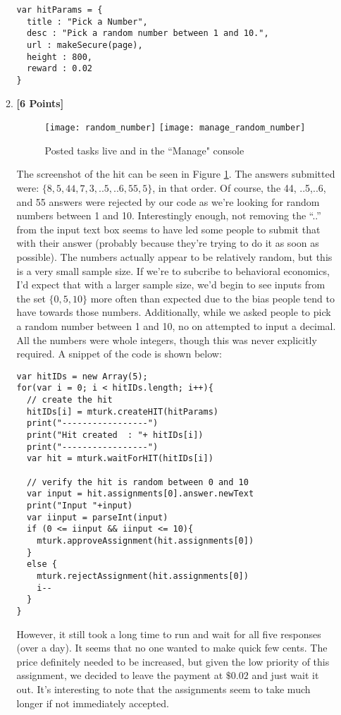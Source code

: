 \documentclass[11pt]{article}
\newcommand{\points}[1]{\textbf{[#1 Points]}}
\begin{document}
\begin{enumerate}
\begin{enumerate}
\begin{lstlisting}
var hitParams = {
  title : "Pick a Number",
  desc : "Pick a random number between 1 and 10.",
  url : makeSecure(page),
  height : 800,
  reward : 0.02
}
\end{lstlisting}

\item \points{6} 
\begin{figure}[!h]
\begin{center}
\texttt{[image: random\_number]}
\texttt{[image: manage\_random\_number]}
\end{center}
\caption{Posted tasks live and in the ``Manage" console}
\label{fig:random_number_hit}
\end{figure}

The screenshot of the hit can be seen in Figure \ref{fig:random_number_hit}. The answers submitted were: $\{8,5,44,7,3,..5,..6,55,5\}$, in that order. Of course, the 44, ..5,..6, and 55 answers were rejected by our code as we're looking for random numbers between 1 and 10. Interestingly enough, not removing the ``..'' from the input text box seems to have led some people to submit that with their answer (probably because they're trying to do it as soon as possible). The numbers actually appear to be relatively random, but this is a very small sample size. If we're to subcribe to behavioral economics, I'd expect that with a larger sample size, we'd begin to see inputs from the set $\{0,5,10 \}$  more often than expected due to the bias people tend to have towards those numbers. Additionally, while we asked people to pick a random number between 1 and 10, no on attempted to input a decimal. All the numbers were whole integers, though this was never explicitly required. A snippet of the code is shown below:

\begin{lstlisting}
var hitIDs = new Array(5);
for(var i = 0; i < hitIDs.length; i++){
  // create the hit
  hitIDs[i] = mturk.createHIT(hitParams)
  print("-----------------")
  print("Hit created  : "+ hitIDs[i])
  print("-----------------")
  var hit = mturk.waitForHIT(hitIDs[i])

  // verify the hit is random between 0 and 10
  var input = hit.assignments[0].answer.newText
  print("Input "+input)
  var iinput = parseInt(input)
  if (0 <= iinput && iinput <= 10){
    mturk.approveAssignment(hit.assignments[0])
  }
  else {
    mturk.rejectAssignment(hit.assignments[0])
    i--
  }
}
\end{lstlisting}

However, it still took  a long time to run and wait for all five responses (over a day). It seems that no one wanted to make quick few cents. The price definitely needed to be increased, but given the low priority of this assignment, we decided to leave the payment at $\$0.02$ and just wait it out. It's interesting to note that the assignments seem to take much longer if not immediately accepted.
\end{enumerate}


\end{enumerate}
\end{document}
